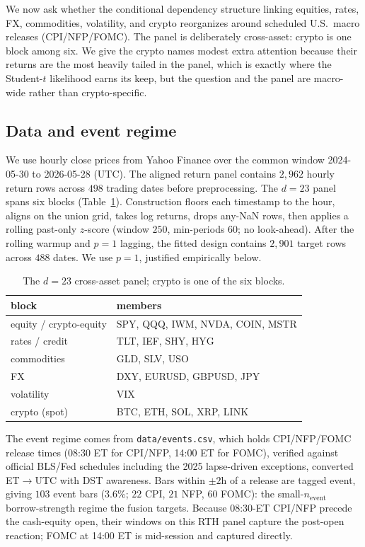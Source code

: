 \documentclass{article}
\begin{document}
We now ask whether the conditional dependency structure linking equities, rates, FX,
commodities, volatility, and crypto reorganizes around scheduled U.S.\ macro releases
(CPI/NFP/FOMC). The panel is deliberately cross-asset: crypto is one block among six.
We give the crypto names modest extra attention because their returns are the most
heavily tailed in the panel, which is exactly where the Student-$t$ likelihood earns
its keep, but the question and the panel are macro-wide rather than crypto-specific.

\subsection{Data and event regime}
We use hourly close prices from Yahoo Finance over the common window
2024-05-30 to 2026-05-28 (UTC). The aligned return panel contains $2{,}962$ hourly
return rows across $498$ trading dates before preprocessing. The $d=23$ panel spans
six blocks (Table~\ref{tab:panel}). Construction floors each timestamp to the hour,
aligns on the union grid, takes log returns, drops any-NaN rows, then applies a
rolling past-only $z$-score (window $250$, min-periods $60$; no look-ahead). After
the rolling warmup and $p=1$ lagging, the fitted design contains $2{,}901$ target rows
across $488$ dates. We use $p=1$, justified empirically below.

\begin{table}[t]
\centering
\small
\begin{tabular}{ll}
\toprule
block & members\\
\midrule
equity / crypto-equity & SPY, QQQ, IWM, NVDA, COIN, MSTR\\
rates / credit         & TLT, IEF, SHY, HYG\\
commodities            & GLD, SLV, USO\\
FX                     & DXY, EURUSD, GBPUSD, JPY\\
volatility             & VIX\\
crypto (spot)          & BTC, ETH, SOL, XRP, LINK\\
\bottomrule
\end{tabular}
\caption{The $d=23$ cross-asset panel; crypto is one of the six blocks.}
\label{tab:panel}
\end{table}

The event regime comes from \texttt{data/events.csv}, which holds CPI/NFP/FOMC release
times (08:30 ET for CPI/NFP, 14:00 ET for FOMC), verified against official BLS/Fed
schedules including the 2025 lapse-driven exceptions, converted ET$\to$UTC with DST
awareness. Bars within $\pm2$h of a release are tagged event, giving $103$ event bars
(3.6\%; $22$ CPI, $21$ NFP, $60$ FOMC): the small-$n_{\text{event}}$
borrow-strength regime the fusion targets. Because
08:30-ET CPI/NFP precede the cash-equity open, their windows on this RTH panel capture
the post-open reaction; FOMC at 14:00 ET is mid-session and captured directly.
\end{document}
